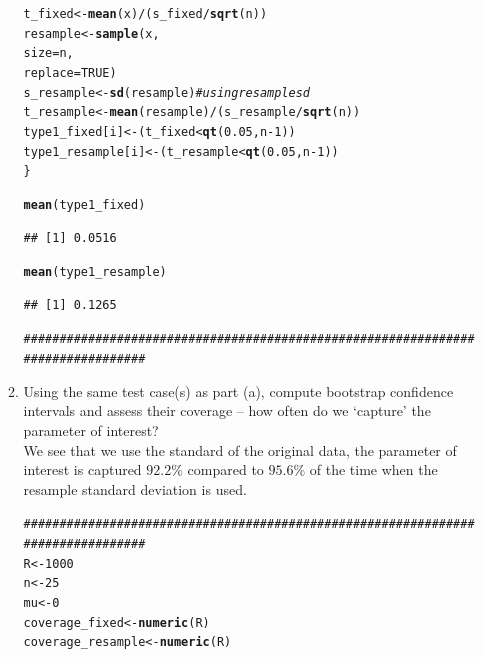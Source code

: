 \documentclass{article}\usepackage[]{graphicx}\usepackage[]{xcolor}
\makeatletter
\newcommand{\hlnum}[1]{\textcolor[rgb]{0.686,0.059,0.569}{#1}}%
\newcommand{\hlcom}[1]{\textcolor[rgb]{0.678,0.584,0.686}{\textit{#1}}}%
\newcommand{\hlopt}[1]{\textcolor[rgb]{0,0,0}{#1}}%
\newcommand{\hldef}[1]{\textcolor[rgb]{0.345,0.345,0.345}{#1}}%
\newcommand{\hlkwb}[1]{\textcolor[rgb]{0.69,0.353,0.396}{#1}}%
\newcommand{\hlkwc}[1]{\textcolor[rgb]{0.333,0.667,0.333}{#1}}%
\newcommand{\hlkwd}[1]{\textcolor[rgb]{0.737,0.353,0.396}{\textbf{#1}}}%
\newenvironment{kframe}{%
 \def\at@end@of@kframe{}%
 \ifinner\ifhmode%
  \def\at@end@of@kframe{\end{minipage}}%
  \begin{minipage}{\columnwidth}%
 \fi\fi%
 \def\FrameCommand##1{\hskip\@totalleftmargin \hskip-\fboxsep
 \colorbox{shadecolor}{##1}\hskip-\fboxsep
     \hskip-\linewidth \hskip-\@totalleftmargin \hskip\columnwidth}%
 \MakeFramed {\advance\hsize-\width
   \@totalleftmargin\z@ \linewidth\hsize
   \@setminipage}}%
 {\par\unskip\endMakeFramed%
 \at@end@of@kframe}
\newenvironment{knitrout}{}{} %
\makeatother
\begin{document}
\begin{enumerate}
\begin{enumerate}
\begin{knitrout}
\begin{kframe}
\begin{alltt}
  \hldef{t_fixed} \hlkwb{<-} \hlkwd{mean}\hldef{(x)} \hlopt{/} \hldef{(s_fixed} \hlopt{/} \hlkwd{sqrt}\hldef{(n))}
  \hldef{resample} \hlkwb{<-} \hlkwd{sample}\hldef{(x,}
                     \hlkwc{size} \hldef{= n,}
                     \hlkwc{replace} \hldef{=} \hlnum{TRUE}\hldef{)}
  \hldef{s_resample} \hlkwb{<-} \hlkwd{sd}\hldef{(resample)} \hlcom{# using resample sd}
  \hldef{t_resample} \hlkwb{<-} \hlkwd{mean}\hldef{(resample)} \hlopt{/} \hldef{(s_resample} \hlopt{/} \hlkwd{sqrt}\hldef{(n))}
  \hldef{type1_fixed[i]} \hlkwb{<-} \hldef{(t_fixed} \hlopt{<} \hlkwd{qt}\hldef{(}\hlnum{0.05}\hldef{, n} \hlopt{-} \hlnum{1}\hldef{))}
  \hldef{type1_resample[i]} \hlkwb{<-} \hldef{(t_resample} \hlopt{<} \hlkwd{qt}\hldef{(}\hlnum{0.05}\hldef{, n} \hlopt{-} \hlnum{1}\hldef{))}
\hldef{\}}

\hlkwd{mean}\hldef{(type1_fixed)}
\end{alltt}
\begin{verbatim}
## [1] 0.0516
\end{verbatim}
\begin{alltt}
\hlkwd{mean}\hldef{(type1_resample)}
\end{alltt}
\begin{verbatim}
## [1] 0.1265
\end{verbatim}
\begin{alltt}
\hlcom{################################################################################}
\end{alltt}
\end{kframe}
\end{knitrout}
  \item Using the same test case(s) as part (a), compute bootstrap confidence 
  intervals and assess their coverage -- how often do we `capture' the parameter
of interest? \\
We see that we use the standard of the original data, the parameter of interest is captured $92.2\%$ compared to $95.6\%$ of the time when the resample standard deviation is used.
\begin{knitrout}\scriptsize
{}\color{fgcolor}\begin{kframe}
\begin{alltt}
\hlcom{################################################################################}
\hldef{R} \hlkwb{<-} \hlnum{1000}
\hldef{n} \hlkwb{<-} \hlnum{25}
\hldef{mu} \hlkwb{<-} \hlnum{0}
\hldef{coverage_fixed} \hlkwb{<-} \hlkwd{numeric}\hldef{(R)}
\hldef{coverage_resample} \hlkwb{<-} \hlkwd{numeric}\hldef{(R)}

\end{alltt}
\end{kframe}
\end{knitrout}
\end{enumerate}
\end{enumerate}
\end{document}
